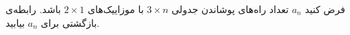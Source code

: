     \p 
فرض کنید
$a_n$
تعداد راه‌های پوشاندن جدولی
$3 \times n$
با موزاییک‌های
$2 \times 1$
باشد. رابطه‌ی بازگشتی برای
$a_n$
بیابید.